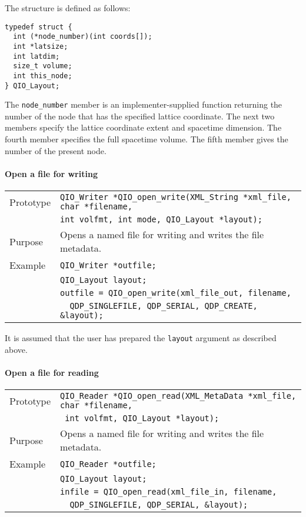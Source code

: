 \documentclass{article}
\newcommand{\QMDhandle}{{\tt XML\_String}}
\begin{document}
The structure is defined as follows:
\begin{verbatim}
typedef struct {
  int (*node_number)(int coords[]);
  int *latsize;
  int latdim;
  size_t volume;
  int this_node;
} QIO_Layout;
\end{verbatim}
%
The \verb|node_number| member is an implementer-supplied function
returning the number of the node that has the specified lattice
coordinate.  The next two members specify the lattice coordinate
extent and spacetime dimension.  The fourth member specifies the full
spacetime volume.  The fifth member gives the number of the present
node.

\paragraph{Open a file for writing}

\begin{flushleft}
  \begin{tabular}{|l|l|}
  \hline
  Prototype      & \verb|QIO_Writer *QIO_open_write(|\QMDhandle\verb| *xml_file, char *filename, |\\
		 & \verb|int volfmt, int mode, QIO_Layout *layout);| \\
  Purpose        & Opens a named file for writing and writes the file metadata. \\
\hline
  Example  & \verb|QIO_Writer *outfile;| \\
           & \verb|QIO_Layout layout;| \\
           & \verb|outfile = QIO_open_write(xml_file_out, filename, |\\
	   & \verb|  QDP_SINGLEFILE, QDP_SERIAL, QDP_CREATE, &layout);| \\
   \hline
 \end{tabular}
\end{flushleft}
%
It is assumed that the user has prepared the \verb|layout| argument as described above.

\paragraph{Open a file for reading}

\begin{flushleft}
  \begin{tabular}{|l|l|}
  \hline
  Prototype      & \verb|QIO_Reader *QIO_open_read(XML_MetaData *xml_file, char *filename,|\\
                 & \verb| int volfmt, QIO_Layout *layout);|\\
  Purpose        & Opens a named file for writing and writes the file metadata. \\
\hline
  Example  & \verb|QIO_Reader *outfile;| \\
           & \verb|QIO_Layout layout;| \\
           & \verb|infile = QIO_open_read(xml_file_in, filename, |\\
           & \verb|  QDP_SINGLEFILE, QDP_SERIAL, &layout);| \\
   \hline
 \end{tabular}
\end{flushleft}
%
\end{document}
